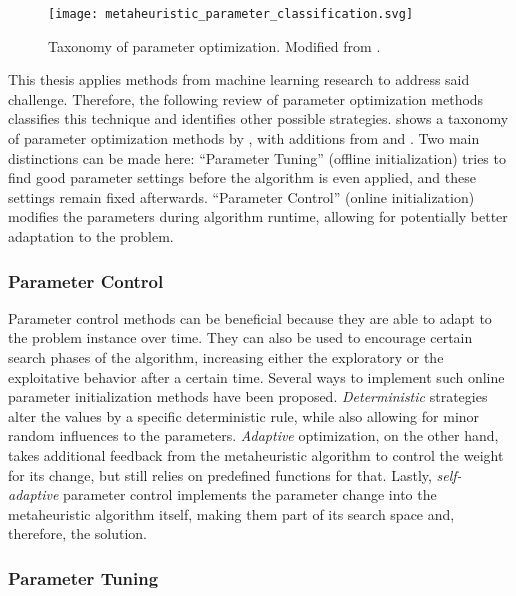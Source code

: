 \begin{figure}[h]
	\centering
	\texttt{[image: metaheuristic\_parameter\_classification.svg]}
	\caption[Taxonomy of parameter optimization]{Taxonomy of parameter optimization. Modified from \citet{eiben1999parameter}.}
	\label{fig:paramtax}
\end{figure}

This thesis applies methods from machine learning research to address said challenge. Therefore, the following review of parameter optimization methods classifies this technique and identifies other possible strategies.  shows a taxonomy of parameter optimization methods by \citet{eiben1999parameter}, with additions from \citet{talbi2009metaheuristics} and \citet{stutzle2012parameter}. Two main distinctions can be made here: \enquote{Parameter Tuning} (offline initialization) tries to find good parameter settings before the algorithm is even applied, and these settings remain fixed afterwards. \enquote{Parameter Control} (online initialization) modifies the parameters during algorithm runtime, allowing for potentially better adaptation to the problem.

\subsubsection{Parameter Control}

Parameter control methods can be beneficial because they are able to adapt to the problem instance over time. They can also be used to encourage certain search phases of the algorithm, increasing either the exploratory or the exploitative behavior after a certain time. Several ways to implement such online parameter initialization methods have been proposed. \textit{Deterministic} strategies alter the values by a specific deterministic rule, while also allowing for minor random influences to the parameters. \textit{Adaptive} optimization, on the other hand, takes additional feedback from the metaheuristic algorithm to control the weight for its change, but still relies on predefined functions for that. Lastly, \textit{self-adaptive} parameter control implements the parameter change into the metaheuristic algorithm itself, making them part of its search space and, therefore, the solution.

\subsubsection{Parameter Tuning}

